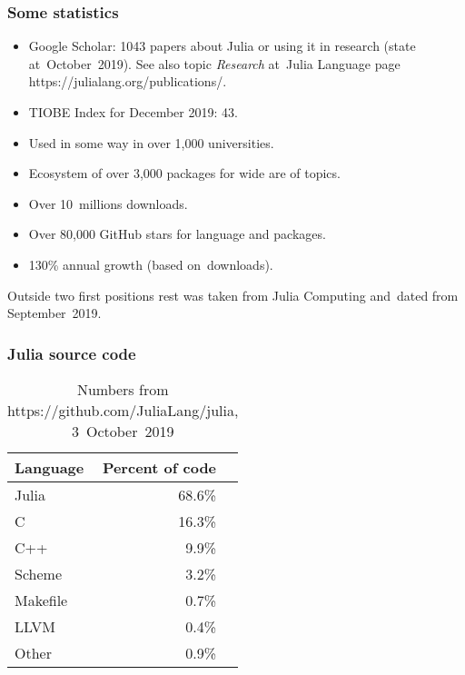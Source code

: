 \documentclass[10pt,t]{beamer}
\begin{document}
\begin{frame}
  \frametitle{Some statistics}


  \begin{itemize}
    \RaggedRight

  \item Google Scholar: 1043 papers about Julia or using it in
    research (state at~October~2019). See also topic \textit{Research}
    at~Julia Language page
    {https://julialang.org/publications/}.

  \item TIOBE Index for December 2019: 43.

  \item Used in some way in over 1,000 universities.

  \item Ecosystem of over 3,000 packages for wide are of topics.

  \item Over 10~millions downloads.

  \item Over 80,000 GitHub stars for language and packages.

  \item 130\% annual growth (based on~downloads).

  \end{itemize}


  Outside two first positions rest was taken from Julia Computing
  and~dated from September~2019.

\end{frame}





\begin{frame}
  \frametitle{Julia source code}


  \begin{table}

    \centering

    \begin{tabular}{|l|r|r|}
      \hline
      Language & Percent of code \\
      \hline
      Julia & 68.6\% \\
      \hline
      C & 16.3\% \\
      \hline
      C++ & 9.9\% \\
      \hline
      Scheme & 3.2\% \\
      \hline
      Makefile & 0.7\% \\
      \hline
      LLVM & 0.4\% \\
      \hline
      Other & 0.9\% \\
      \hline
    \end{tabular}

    \caption{Numbers from 
      {https://github.com/JuliaLang/julia}, 3~October~2019}

  \end{table}

\end{frame}
\end{document}
